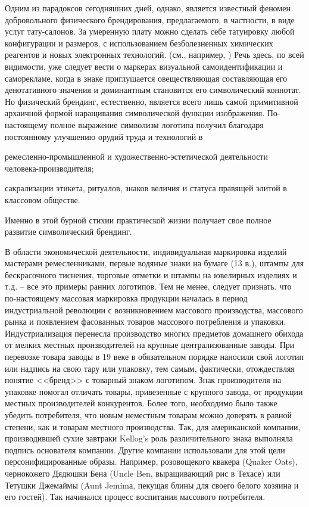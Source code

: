Одним из парадоксов сегодняшних дней, однако, является известный феномен
добровольного физического брендирования, предлагаемого, в частности, в виде
услуг тату-салонов. За умеренную плату можно сделать себе татуировку любой
конфигурации и размеров, с использованием безболезненных химических реагентов
и новых электронных технологий. (см., например, \autocite{digitaltattoo}\autocite{tedtattoo})
Речь здесь, по всей видимости, уже следует вести о маркерах визуальной
самоидентификации и саморекламе, когда в знаке приглушается овеществляющая
составляющая его денотативного значения и доминантным становится его символический
коннотат. Но физический брендинг, естественно, является всего лишь самой примитивной
архаичной формой наращивания символической функции изображения. По-настоящему
полное выражение символизм логотипа получил благодаря постоянному улучшению
орудий труда и технологий в
\begin{enumerate*}[label=\asbuk*)]
    \item ремесленно-промышленной и художественно-эстетической деятельности человека-производителя;
    \item сакрализации этикета, ритуалов, знаков величия и статуса правящей элитой в
    классовом обществе.
\end{enumerate*}
Именно в этой бурной стихии практической жизни получает свое полное
развитие символический брендинг.

В области экономической деятельности, индивидуальная маркировка изделий мастерами
ремесленниками, первые водяные знаки на бумаге (13 в.), штампы для бескрасочного
тиснения, торговые отметки и штампы на ювелирных изделиях и т.д. -- все это примеры
ранних логотипов. Тем не менее, следует признать, что по-настоящему массовая маркировка
продукции началась в период индустриальной революции с возникновением массового производства,
массового рынка и появлением фасованных товаров массового потребления и упаковки.
Индустриализация перенесла производство многих предметов домашнего обихода от
мелких местных производителей на крупные централизованные заводы. При перевозке
товара заводы в 19 веке в обязательном порядке наносили свой логотип или надпись на
свою тару или упаковку, тем самым, фактически,  отождествляя понятие <<бренд>>
с  товарный знаком-логотипом.  Знак производителя на упаковке помогал отличать
товары, привезенные с крупного завода, от продукции местных производителей конкурентов.
Более того, необходимо было также убедить потребителя, что новым неместным товарам
можно доверять в равной степени, как  и товарам местного производства. Так, для
американской компании, производившей сухие завтраки Kellog’s  роль различительного
знака выполняла подпись основателя компании.\autocite[][8]{evami2009} Другие компании использовали
для этой цели персонифицированные образы. Например, розовощекого квакера (Quaker Oats),
чернокожего Дядюшки Бена (Uncle Ben, выращивающий рис в Техасе) или
Тетушки Джемаймы (Aunt Jemimа, пекущая блины для своего белого хозяина и его гостей). \autocite[][8]{evami2009}
Так начинался процесс воспитания массового потребителя.

